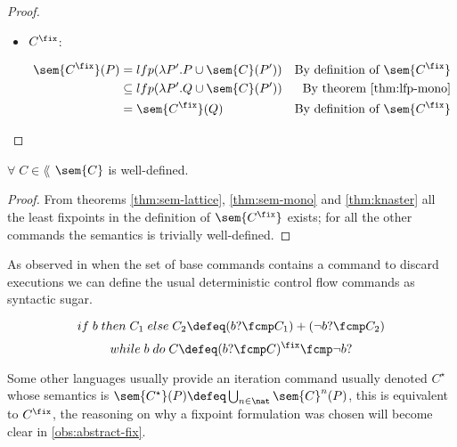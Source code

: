 \begin{definition}
\begin{proof}
\begin{itemize}
      \item $C^\fix$:

        \begin{align*}
          \sem{C^\fix}(P) 
            &= lfp(\lambda P'. P \cup \sem{C}(P'))
            &\text{By definition of $\sem{C^\fix}$}\\
            &\subseteq lfp(\lambda P'. Q \cup \sem{C}(P'))
            &\text{By theorem \ref{thm:lfp-mono}}\\
            &= \sem{C^\fix}(Q) 
            &\text{By definition of $\sem{C^\fix}$}\\
        \end{align*}

    \end{itemize}

  \end{proof}

  \begin{lemma}
    $\forall \; C \in \lang$ $\sem{C}$ is well-defined.
  \end{lemma}
  \begin{proof}
    From theorems \ref{thm:sem-lattice}, \ref{thm:sem-mono} and 
    \ref{thm:knaster} all the least fixpoints in the definition of 
    $\sem{C^\fix}$ exists; for all the other commands the semantics is 
    trivially well-defined.
  \end{proof}

  \begin{observation}
    As observed in \cite{Fischer79} when the set of base commands contains a 
    command to discard executions we can define the usual deterministic control 
    flow commands as syntactic sugar.

    $$if \; b \; then \; C_1 \; else \; C_2 \defeq (b ? \fcmp C_1) 
    + (\neg b ? \fcmp C_2)$$
    $$while \; b \; do \; C \defeq (b? \fcmp C)^\fix \fcmp \neg b ?$$
  \end{observation}

  \begin{observation}
    Some other languages usually provide an iteration command usually denoted
    $C^\star$ whose semantics is $\sem{C^\star}(P) \defeq \bigcup_{n \in \nat}
    \sem{C}^n(P)$, this is equivalent to $C^\fix$, the reasoning on why a
    fixpoint formulation was chosen will become clear in 
    \ref{obs:abstract-fix}.
  \end{observation}

\end{definition}
